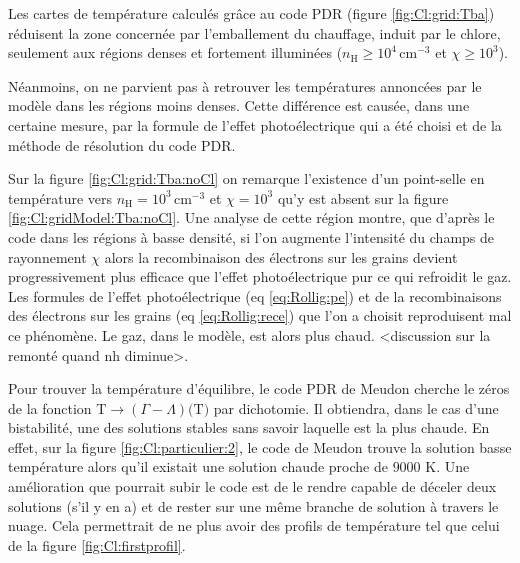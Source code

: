Les cartes de température calculés grâce au code PDR (figure \ref{fig:Cl:grid:Tba}) réduisent la zone concernée par l'emballement du chauffage, induit par le chlore, seulement aux régions denses et fortement illuminées ($n_\mathrm{H} \geq 10^4 \, \mathrm{cm}^{-3}$ et $\chi \geq 10^3$).  \newline 

Néanmoins, on ne parvient pas à retrouver les températures annoncées par le modèle dans les régions moins denses. Cette différence est causée, dans une certaine mesure, par la formule de l'effet photoélectrique qui a été choisi et de la méthode de résolution du code PDR. 

Sur la figure \ref{fig:Cl:grid:Tba:noCl} on remarque l'existence d'un point-selle en température vers $n_\mathrm{H}=10^3 \, \mathrm{cm}^{-3}$ et $\chi=10^3$ qu'y est absent sur la figure \ref{fig:Cl:gridModel:Tba:noCl}. Une analyse de cette région montre, que d'après le code dans les régions à basse densité, si l'on augmente l'intensité du champs de rayonnement $\chi$ alors la recombinaison des électrons sur les grains devient progressivement plus efficace que l'effet photoélectrique pur ce qui refroidit le gaz. Les formules de l'effet photoélectrique (eq \ref{eq:Rollig:pe}) et de la recombinaisons des électrons sur les grains (eq \ref{eq:Rollig:rece}) que l'on a choisit reproduisent mal ce phénomène. Le gaz, dans le modèle, est alors plus chaud. <discussion sur la remonté quand nh diminue>. 

Pour trouver la température d'équilibre, le code PDR de Meudon cherche le zéros de la fonction $\mathrm{T} \rightarrow (\Gamma - \Lambda)(\mathrm{T)}$ par dichotomie. Il obtiendra, dans le cas d'une bistabilité, une des solutions stables sans savoir laquelle est la plus chaude. En effet, sur la figure \ref{fig:Cl:particulier:2}, le code de Meudon trouve la solution basse température alors qu'il existait une solution chaude proche de $9000$ K. Une amélioration que pourrait subir le code est de le rendre capable de déceler deux solutions (s'il y en a) et de rester sur une même branche de solution à travers le nuage. Cela permettrait de ne plus avoir des profils de température tel que celui de la figure \ref{fig:Cl:firstprofil}. \newline 

